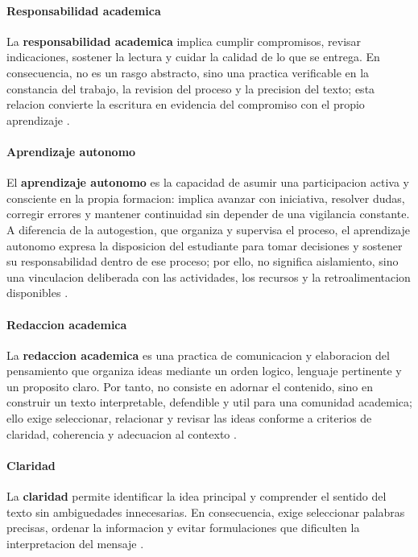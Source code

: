 \documentclass[
	spanish,
	letterpaper, oneside
]{article}
\begin{document}
\paragraph{\textbf{Responsabilidad academica}}
La \textbf{responsabilidad academica} implica cumplir compromisos, revisar indicaciones, sostener la lectura y cuidar la calidad de lo que se entrega. En consecuencia, no es un rasgo abstracto, sino una practica verificable en la constancia del trabajo, la revision del proceso y la precision del texto; esta relacion convierte la escritura en evidencia del compromiso con el propio aprendizaje \citep{correaManualBasicoEscritura2018,nunezcortesEscrituraAcademicaTeoria2015}.

\paragraph{\textbf{Aprendizaje autonomo}}
El \textbf{aprendizaje autonomo} es la capacidad de asumir una participacion activa y consciente en la propia formacion: implica avanzar con iniciativa, resolver dudas, corregir errores y mantener continuidad sin depender de una vigilancia constante. A diferencia de la autogestion, que organiza y supervisa el proceso, el aprendizaje autonomo expresa la disposicion del estudiante para tomar decisiones y sostener su responsabilidad dentro de ese proceso; por ello, no significa aislamiento, sino una vinculacion deliberada con las actividades, los recursos y la retroalimentacion disponibles \citep{correaManualBasicoEscritura2018}.

\paragraph{\textbf{Redaccion academica}}
La \textbf{redaccion academica} es una practica de comunicacion y elaboracion del pensamiento que organiza ideas mediante un orden logico, lenguaje pertinente y un proposito claro. Por tanto, no consiste en adornar el contenido, sino en construir un texto interpretable, defendible y util para una comunidad academica; ello exige seleccionar, relacionar y revisar las ideas conforme a criterios de claridad, coherencia y adecuacion al contexto \citep{nunezcortesEscrituraAcademicaTeoria2015}.

\paragraph{\textbf{Claridad}}
La \textbf{claridad} permite identificar la idea principal y comprender el sentido del texto sin ambiguedades innecesarias. En consecuencia, exige seleccionar palabras precisas, ordenar la informacion y evitar formulaciones que dificulten la interpretacion del mensaje \citep{correaManualBasicoEscritura2018,nunezcortesEscrituraAcademicaTeoria2015}.
\end{document}
